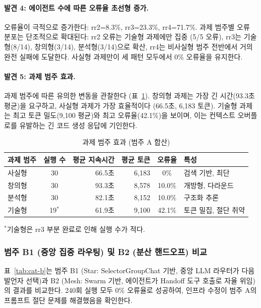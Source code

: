 \paragraph{발견 4: 에이전트 수에 따른 오류율 초선형 증가.}
오류율이 극적으로 증가한다: rr2=8.3\%, rr3=23.3\%, rr4=71.7\%. 과제 범주별 오류 분포는 단조적으로 확대된다: rr2 오류는 기술형 과제에만 집중 (5/5 오류), rr3는 기술형(8/14), 창의형(3/14), 분석형(3/14)으로 확산, rr4는 비사실형 범주 전반에서 거의 완전 실패에 도달한다. 사실형 과제만이 세 패턴 모두에서 0\% 오류율을 유지한다.

\paragraph{발견 5: 과제 범주 효과.}
과제 범주에 따른 유의한 변동을 관찰한다 (표~\ref{tab:task-category-effect}). 창의형 과제는 가장 긴 시간(93.3초 평균)을 요구하고, 사실형 과제가 가장 효율적이다 (66.5초, 6,183 토큰). 기술형 과제는 최고 토큰 밀도(9,100 평균)와 최고 오류율(42.1\%)을 보이며, 이는 컨텍스트 오버플로를 유발하는 긴 코드 생성 응답에 기인한다.

\begin{table}[H]
\centering
\caption{과제 범주 효과 (범주 A 합산)}
\label{tab:task-category-effect}
{\small
\begin{tabular}{lcrrc l}
\toprule
과제 범주 & 실행 수 & 평균 지속시간 & 평균 토큰 & 오류율 & 특성 \\
\midrule
사실형 & 30 & 66.5초 & 6,183 & 0\% & 검색 기반, 최단 \\
창의형 & 30 & 93.3초 & 8,578 & 10.0\% & 개방형, 다라운드 \\
분석형 & 30 & 82.1초 & 8,152 & 10.0\% & 구조화 추론 \\
기술형 & 19$^{*}$ & 61.9초 & 9,100 & 42.1\% & 토큰 밀집, 절단 취약 \\
\bottomrule
\end{tabular}
}

\smallskip
{\footnotesize $^{*}$기술형은 rr3 부분 완료로 인해 실행 수가 적다.}
\end{table}

\subsubsection{범주 B1 (중앙 집중 라우팅) 및 B2 (분산 핸드오프) 비교}

표~\ref{tab:cat-b}는 범주 B1 (Star: SelectorGroupChat 기반, 중앙 LLM 라우터가 다음 발언자 선택)과 B2 (Mesh: Swarm 기반, 에이전트가 Handoff 도구 호출로 자율 위임)의 결과를 비교한다. 240회 실행 모두 0\% 오류율로 성공하여, 인프라 수정이 범주 A의 프롬프트 절단 문제를 해결했음을 확인한다.

